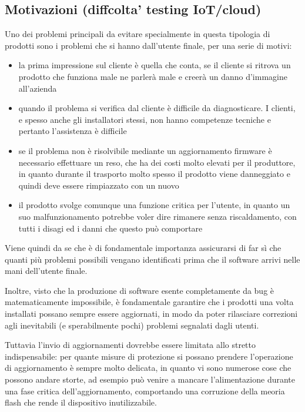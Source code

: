 \documentclass{article}
\begin{document}
\subsection{Motivazioni (diffcolta' testing IoT/cloud)}

Uno dei problemi principali da evitare specialmente in questa tipologia di prodotti
sono i problemi che si hanno dall'utente finale, per una serie di motivi:

\begin{itemize}
\item la prima impressione sul cliente è quella che conta, se il cliente si ritrova
    un prodotto che funziona male ne parlerà male e creerà un danno d'immagine all'azienda
\item quando il problema si verifica dal cliente è difficile da diagnosticare. I clienti,
    e spesso anche gli installatori stessi, non hanno competenze tecniche e pertanto l'assistenza è difficile
\item se il problema non è risolvibile mediante un aggiornamento firmware è necessario
    effettuare un reso, che ha dei costi molto elevati per il produttore, in quanto
    durante il trasporto molto spesso il prodotto viene danneggiato e quindi deve essere rimpiazzato con un nuovo
\item il prodotto svolge comunque una funzione critica per l'utente, in quanto un suo
    malfunzionamento potrebbe voler dire rimanere senza riscaldamento, con tutti i disagi
    ed i danni che questo può comportare
\end{itemize}

Viene quindi da se che è di fondamentale importanza assicurarsi di far sì che quanti
più problemi possibili vengano identificati prima che il software arrivi nelle mani
dell'utente finale.

Inoltre, visto che la produzione di software esente completamente da bug
è matematicamente impossibile, è fondamentale garantire che i prodotti una volta
installati possano sempre essere aggiornati, in modo da poter rilasciare correzioni agli
inevitabili (e sperabilmente pochi) problemi segnalati dagli utenti.

Tuttavia l'invio di aggiornamenti dovrebbe essere limitata allo stretto indispensabile:
per quante misure di protezione si possano prendere l'operazione di aggiornamento è sempre
molto delicata, in quanto vi sono numerose cose che possono andare storte, ad esempio
può venire a mancare l'alimentazione durante una fase critica dell'aggiornamento,
comportando una corruzione della meoria flash che rende il dispositivo inutilizzabile.
\end{document}

